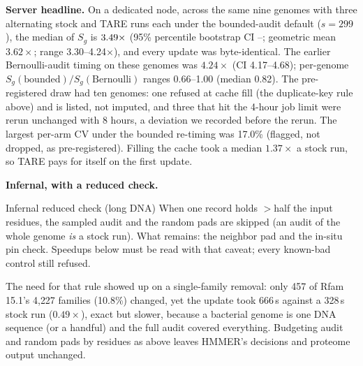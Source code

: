 \documentclass[letterpaper,twocolumn,10pt]{article}
\theoremstyle{definition}
\newcommand{\sys}{TARE\xspace}
\newcommand{\sys}{PARE\xspace}
\begin{document}
\textbf{Server headline.} On a dedicated node, across the same nine genomes with three alternating stock and \sys runs
each under the bounded\nobreakdash-audit default ($s{=}299$), the median of $S_g$ is $3.49\times$ (95\% percentile bootstrap CI
\HeadlineBoundedCIlow--\HeadlineBoundedCIhigh; geometric mean $3.62\times$; range 3.30--4.24$\times$), and every update was byte\nobreakdash-identical.
The earlier Bernoulli\nobreakdash-audit timing on these genomes was $4.24\times$ (CI 4.17--4.68); per\nobreakdash-genome
$S_g(\mathrm{bounded})/S_g(\mathrm{Bernoulli})$ ranges 0.66--1.00 (median 0.82). The pre\nobreakdash-registered draw had ten genomes: one refused at
cache fill (the duplicate\nobreakdash-key rule above) and is listed, not imputed, and three that hit the 4-hour job limit were rerun
unchanged with 8 hours, a deviation we recorded before the rerun. The largest per\nobreakdash-arm CV under the bounded re\nobreakdash-timing was 17.0\% (flagged, not dropped,
as pre\nobreakdash-registered). Filling the cache took a median $1.37\times$ a stock run, so \sys pays for itself on the first update.

\textbf{Infernal, with a reduced check.}
\begin{plainbox}{Infernal reduced check (long DNA)}
When one record holds $>$half the input residues, the sampled audit and the random pads are skipped (an audit of the whole genome \textit{is} a stock run).
What remains: the neighbor pad and the in\nobreakdash-situ pin check. Speedups below must be read with that caveat; every known\nobreakdash-bad control still refused.
\end{plainbox}
The need for that rule showed up on a single\nobreakdash-family removal: only 457 of Rfam 15.1's 4{,}227 families (10.8\%) changed, yet the update took 666\,s against a 328\,s stock run ($0.49\times$), exact but slower, because a bacterial genome is one DNA sequence (or a handful) and the full audit covered everything. Budgeting audit and random pads by residues as above leaves HMMER's decisions and proteome output unchanged.
\end{document}
